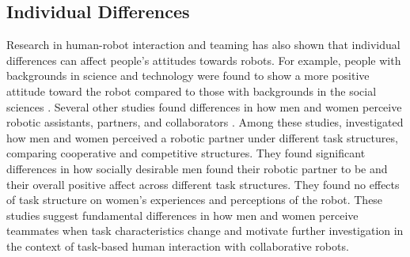 \subsection{Individual Differences}
Research in human-robot interaction and teaming has also shown that individual differences can affect people's attitudes towards robots. For example, people with backgrounds in science and technology were found to show a more positive attitude toward the robot compared to those with backgrounds in the social sciences \cite{nomura2011exploring}. Several other studies found differences in how men and women perceive robotic assistants, partners, and collaborators \cite{mutlu2006storytelling,schermerhorn2008robot,takayama2009influences}. Among these studies, \citet{mutlu2006task} investigated how men and women perceived a robotic partner under different task structures, comparing cooperative and competitive structures. They found significant differences in how socially desirable men found their robotic partner to be and their overall positive affect across different task structures. They found no effects of task structure on women's experiences and perceptions of the robot. These studies suggest fundamental differences in how men and women perceive teammates when task characteristics change and motivate further investigation in the context of task-based human interaction with collaborative robots.